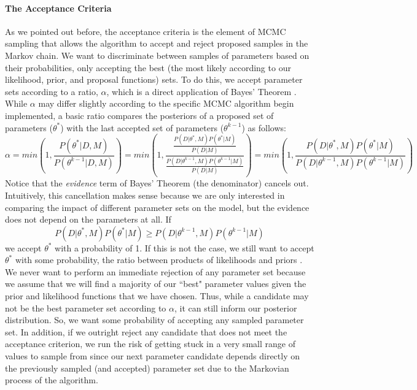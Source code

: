 \paragraph{The Acceptance Criteria} \label{The_Acceptance_Criteria} As we pointed out before, the acceptance criteria is the element of MCMC sampling that allows the algorithm to accept and reject proposed samples in the Markov chain. We want to discriminate between samples of parameters based on their probabilities, only accepting the best (the most likely according to our likelihood, prior, and proposal functions) sets. To do this, we accept parameter sets according to a ratio, $\alpha$, which is a direct application of Bayes' Theorem \cite{astrostats}. While $\alpha$ may differ slightly according to the specific MCMC algorithm begin implemented, a basic ratio compares the posteriors of a proposed set of parameters ($\theta^*$) with the last accepted set of parameters ($\theta^{k-1}$) as follows:
\begin{equation} \label{eq:9mcmc}
\alpha = min(1, \frac{P(\theta^*|D, M)}{P(\theta^{k-1}|D,M)}) = min(1, \frac{\frac{P(D|\theta^*, M)P(\theta^*|M)}{P(D|M)}}{\frac{P(D|\theta^{k-1}, M)P(\theta^{k-1}|M)}{P(D|M)}}) = min(1, \frac{P(D|\theta^*, M)P(\theta^*|M)}{P(D|\theta^{k-1}, M)P(\theta^{k-1}|M)})
\end{equation}
Notice that the \emph{evidence} term of Bayes' Theorem (the denominator) cancels out. Intuitively, this cancellation makes sense because we are only interested in comparing the impact of different parameter sets on the model, but the evidence does not depend on the parameters at all. If 
\begin{equation} \label{eq:10mcmc}
P(D|\theta^*, M)P(\theta^*|M) \geq P(D|\theta^{k-1}, M)P(\theta^{k-1}|M)
\end{equation}
we accept $\theta^*$ with a probability of 1. If this is not the case, we still want to accept $\theta^*$ with some probability, the ratio between products of likelihoods and priors \cite{astrostats}. We never want to perform an immediate rejection of any parameter set because we assume that we will find a majority of our ``best" parameter values given the prior and likelihood functions that we have chosen. Thus, while a candidate may not be the best parameter set according to $\alpha$, it can still inform our posterior distribution. So, we want some probability of accepting any sampled parameter set. In addition, if we outright reject any candidate that does not meet the acceptance criterion, we run the risk of getting stuck in a very small range of values to sample from since our next parameter candidate depends directly on the previously sampled (and accepted) parameter set due to the Markovian process of the algorithm.
